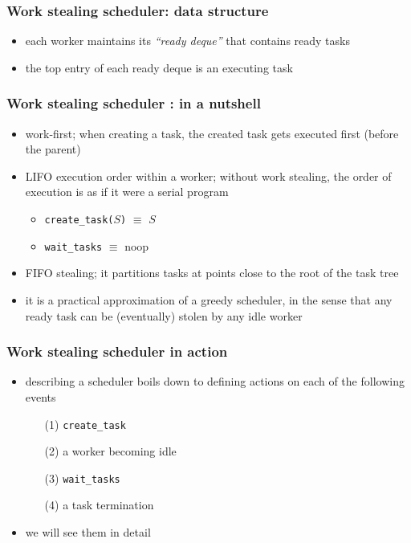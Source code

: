 \documentclass[12pt,dvipdfmx]{beamer}
\newcommand{\ao}[1]{{\color{blue}#1}}
\begin{document}
\begin{frame}
\frametitle{Work stealing scheduler: data structure}
\begin{itemize}
\item []
\begin{center}
\def\svgwidth{0.8\textwidth}

\end{center}
\item each worker maintains its \ao{\em ``ready deque''} 
that contains ready tasks
\item the top entry of each ready deque is an executing task
\end{itemize}
\end{frame}


\begin{frame}
\frametitle{Work stealing scheduler : in a nutshell}
\begin{itemize}
\item<1-> \ao{work-first;} when creating a task, 
  the created task gets executed first (before the parent)

\item<2-> \ao{LIFO execution order within a worker;}
  without work stealing, the order of execution
  is as if it were a serial program
  \begin{itemize}
  \item \ao{\tt create\_task($S$)} $\equiv$ $S$
  \item \ao{\tt wait\_tasks} $\equiv$ noop
  \end{itemize}

\item<3-> \ao{FIFO stealing;} it partitions tasks at points
  close to the root of the task tree
  
\item<4-> it is a practical approximation of a greedy
  scheduler, in the sense that any ready task can
  be (eventually) stolen by any idle worker
\end{itemize}
\end{frame}

\begin{frame}
\frametitle{Work stealing  scheduler in action}
\begin{itemize}
\item describing a scheduler boils down to
  defining actions on each of the following events
  \begin{itemize}
  \item [(1)] \ao{\tt create\_task}
  \item [(2)] a worker becoming idle
  \item [(3)] \ao{\tt wait\_tasks}
  \item [(4)] a task termination
  \end{itemize}
\item we will see them in detail 
\end{itemize}
\end{frame}
\end{document}
